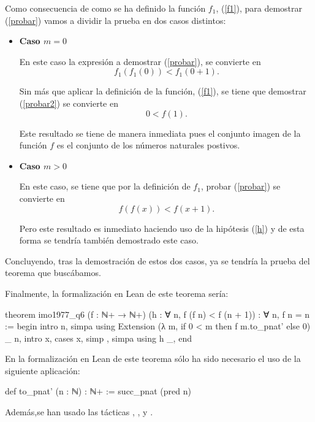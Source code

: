 \begin{demostracion}
  Como consecuencia de como se ha definido la función \(f_1\), (\ref{f1}),
  para demostrar (\ref{probar}) vamos a dividir la prueba en dos casos
  distintos:
  \begin{itemize}
  \item \textbf{Caso \(m=0\)}
    
    En este caso la expresión a demostrar (\ref{probar}), se convierte en
    \begin{equation}\label{probar2}
      f_1(f_1(0))<f_1(0+1).
    \end{equation}

    Sin más que aplicar la definición de la función, (\ref{f1}), se tiene
    que demostrar (\ref{probar2}) se convierte en
    \begin{equation}
      0<f(1).
    \end{equation}

    Este resultado se tiene de manera inmediata pues el conjunto imagen
    de la función \(f\) es el conjunto de los números naturales postivos. 

  \item \textbf{Caso \(m>0\)}

    En este caso, se tiene que por la definición de \(f_1\), probar
    (\ref{probar}) se convierte en
    \begin{equation}\label{probar3}
    f(f(x))<f(x+1).
    \end{equation}

    Pero este resultado es inmediato haciendo uso de la hipótesis
    (\ref{h}) y de esta forma se tendría también demostrado este caso.
  \end{itemize}

  Concluyendo, tras la demostración de estos dos casos, ya se tendría
  la prueba del teorema que buscábamos.
\end{demostracion}

Finalmente, la formalización en Lean de este teorema sería:
\begin{leancode}
theorem imo1977_q6
  (f : ℕ+ → ℕ+)
  (h : ∀ n, f (f n) < f (n + 1))
  : ∀ n, f n = n :=
begin
  intro n,
  simpa using Extension (λ m, if 0 < m then f m.to_pnat' else 0) _ n,
  intro x,
  cases x,
  { simp },
  { simpa using h _},
end
\end{leancode}

En la formalización en Lean de este teorema sólo ha sido necesario el uso
de la siguiente aplicación:
\begin{leancode}
def to_pnat' (n : ℕ) : ℕ+ := succ_pnat (pred n)
\end{leancode}

Además,se han usado las tácticas
,
,
 y
.

